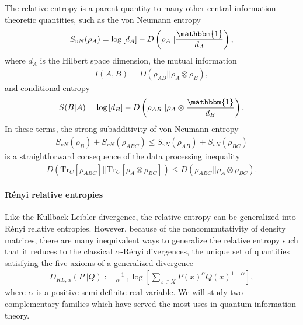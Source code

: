 \documentclass[a4paper,11pt]{article}
\newcommand{\Tr}{\text{Tr}}
\newcommand*{\SR}[1]{\textcolor{magenta}{[SR: \textsf{#1}]}}
\begin{document}
The relative entropy is a parent quantity to many other central information-theoretic quantities, such as the von Neumann entropy
\begin{align}
    S_{vN}(\rho_A) = \log \left[d_A\right] - D\left(\rho_A || \frac{\mathbbm{1}}{d_A}\right),
\end{align}
where $d_A$ is the Hilbert space dimension, the mutual information
\begin{align}
    I(A,B) = D(\rho_{AB}|| \rho_A \otimes \rho_B),
\end{align}
and conditional entropy
\begin{align}
    S(B|A) = \log \left[d_B\right] - D\left(\rho_{AB} || \rho_A \otimes \frac{\mathbbm{1}}{d_B}\right).
\end{align}
In these terms, the strong subadditivity of von Neumann entropy
\begin{align}
    S_{vN}(\rho_B) + S_{vN}(\rho_{ABC})\leq S_{vN}(\rho_{AB}) + S_{vN}(\rho_{BC})
\end{align}
is a straightforward consequence of the data processing inequality
\begin{align}
    D(\Tr_C\left[ \rho_{ABC}\right] || \Tr_C\left[\rho_A \otimes \rho_{BC}\right]) \leq D( \rho_{ABC} || \rho_A \otimes \rho_{BC}) .
\end{align}

\paragraph{R\'enyi relative entropies} Like the Kullback-Leibler divergence, the relative entropy can be generalized
into R\'enyi relative entropies. However, because of the noncommutativity of density matrices, there are many inequivalent ways to generalize the relative entropy such that it reduces to the classical $\alpha$-R\'enyi divergences, the unique set of quantities satisfying the five axioms of a generalized divergence \cite{10020820209}
\begin{align}
    D_{KL,\alpha}(P||Q):= \frac{1}{\alpha -1 }\log\left[ \sum_{x\in X} P(x)^{\alpha} Q(x)^{1-\alpha}\right],
    \label{renyiKL}
\end{align}
where $\alpha$ is a positive semi-definite real variable.
We will study two complementary families which have served the most uses in quantum information theory. 
\end{document}
